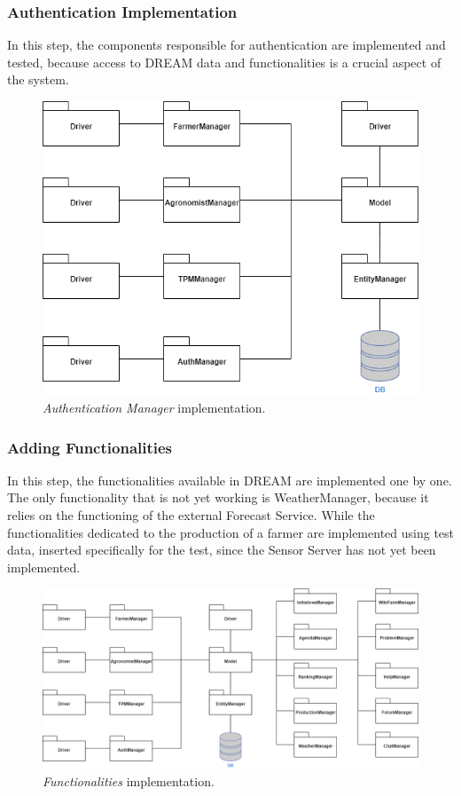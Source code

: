 \subsubsection{Authentication Implementation}
In this step, the components responsible for authentication are implemented and tested, because access to DREAM data and functionalities is a crucial aspect of the system.
\begin{figure}[H]
    \centering
    \includegraphics[scale=0.6]{Images/StepImplementation/Step2.png}
    \caption{\textit{Authentication Manager} implementation.}
\end{figure}
\subsubsection{Adding Functionalities}
In this step, the functionalities available in DREAM are implemented one by one. The only functionality that is not yet working is WeatherManager, because it relies on the functioning of the external Forecast Service. While the functionalities dedicated to the production of a farmer are implemented using test data, inserted specifically for the test, since the Sensor Server has not yet been implemented.
\begin{figure}[H]
    \centering
    \includegraphics[width=\linewidth]{Images/StepImplementation/Step3.png}
    \caption{\textit{Functionalities} implementation.}
\end{figure}
